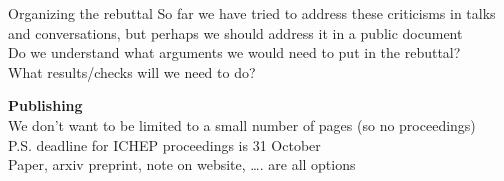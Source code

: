 \documentclass[aspectratio=169,10pt]{beamer}
\begin{document}
\begin{frame}[t]{Organizing the rebuttal}
  So far we have tried to address these criticisms in talks and conversations, but perhaps we should address it in a public document\\
  \vspace*{0.5em}
  Do we understand what arguments we would need to put in the rebuttal?\\
  \vspace*{0.5em}
  What results/checks will we need to do?\\
  \vspace*{2em}

  \textbf{Publishing}\\
  We don't want to be limited to a small number of pages (so no proceedings)\\
  {\footnotesize\qquad P.S. deadline for ICHEP proceedings is 31 October}\\
  \vspace*{0.5em}
  Paper, arxiv preprint, note on website, \ldots. are all options\\
\end{frame}



\end{document}
